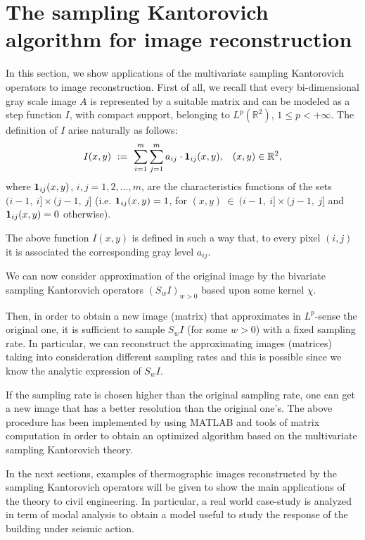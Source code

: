 \documentclass[11pt,a4paper]{article}
\newcommand{\R}{\mathbb{R}}
\begin{document}

\section{The sampling Kantorovich algorithm for image reconstruction}

In this section, we show applications of the multivariate sampling Kantorovich operators to image reconstruction. First of all, we recall that every bi-dimensional gray scale image $A$ is represented by a suitable matrix and can be modeled as a step function $I$, with compact support, belonging to $L^p(\R^2)$, $1 \leq p <+\infty$. The definition of $I$ arise naturally as follows:
$$
I(x,y)\ :=\ \sum^{m}_{i=1}\sum^{m}_{j=1}a_{ij} \cdot \textbf{1}_{ij}(x,y), \hskip0.3cm (x,y) \in \R^2,
$$
where ${\bf 1}_{ij}(x,y)$, $i,j =1,2,\dots,m$, are the characteristics functions of the sets $(i-1,\ i]\times(j-1,\ j]$ (i.e. ${\bf 1}_{ij}(x,y)=1$, for $(x,y)\ \in\ (i-1,\ i]\times(j-1,\ j]$ and ${\bf 1}_{ij}(x,y)=0$ otherwise). 

  The above function $I(x,y)$ is defined in such a way that, to every pixel $(i,j)$ it is associated the corresponding gray level $a_{ij}$. 

  We can now consider approximation of the original image by the bivariate sampling Kantorovich operators $(S_w I)_{w>0}$ based upon some kernel $\chi$. 

  Then, in order to obtain a new image (matrix) that approximates in $L^p$-sense the original one, it is sufficient to sample $S_w I$ (for some $w>0$) with a fixed sampling rate. In particular, we can reconstruct the approximating images (matrices) taking into consideration different sampling rates and this is possible since we know the analytic expression of $S_w I$.

 If the sampling rate is chosen higher than the original sampling rate, one can get a new image that has a better resolution than the original one's. The above procedure has been implemented by using MATLAB and tools of matrix computation in order to obtain an optimized algorithm based on the multivariate sampling Kantorovich theory.

  In the next sections, examples of thermographic images reconstructed by the sampling Kantorovich operators will be given to show the main applications of the theory to civil engineering. In particular, a real world case-study is analyzed in term of modal analysis to obtain a model useful to study the response of the building under seismic action.
%
\end{document}
